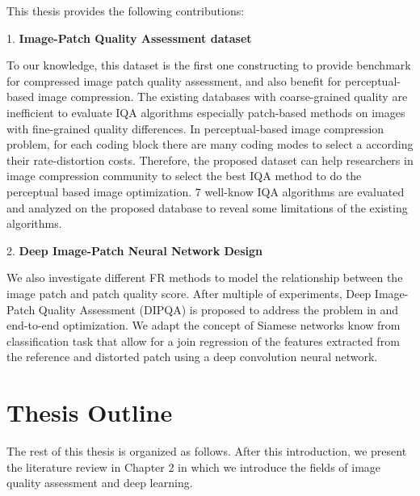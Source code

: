 This thesis provides the following contributions:

1. \textbf{Image-Patch Quality Assessment dataset}

To our knowledge, this dataset is the first one constructing to provide benchmark for compressed image patch quality assessment, and also benefit for perceptual-based image compression. 
The existing databases with coarse-grained quality are inefficient to evaluate IQA algorithms especially patch-based methods on images with fine-grained quality differences. 
In perceptual-based image compression problem, for each coding block there are many coding modes to select a according their rate-distortion costs. Therefore, the proposed dataset can help researchers in image compression community to select the best IQA method to do the perceptual based image optimization. 7 well-know IQA algorithms are evaluated and analyzed on the proposed database to reveal some limitations of the existing algorithms.

2. \textbf{Deep Image-Patch Neural Network Design}

We also investigate different FR methods to model the relationship between the image patch and patch quality score. 
After multiple of experiments, Deep Image-Patch Quality Assessment (DIPQA) is proposed to address the problem in and end-to-end optimization. 
We adapt the concept of Siamese networks know from classification task \cite{BROMLEY2004,Chopra2005} that allow for a join regression of the features extracted from the reference and distorted patch using a deep convolution neural network. 

\section{Thesis Outline}

The rest of this thesis is organized as follows. After this introduction, we present the literature review in Chapter 2 in which we introduce the fields of image quality assessment and deep learning.